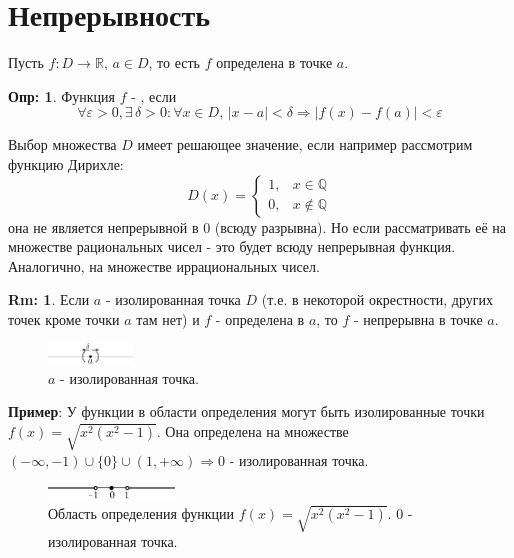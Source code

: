\documentclass[12pt]{article}
\theoremstyle{definition}
\newtheorem{defn}{Опр:}
\newtheorem{rem}{Rm:}
\begin{document}
\newpage 
\section*{Непрерывность}

Пусть $f \colon D \to \mathbb{R}, \, a \in D$, то есть $f$ определена в точке $a$.

\begin{defn}
	Функция $f$ - , если 
	$$\forall \varepsilon > 0, \exists \, \delta > 0 \colon \forall x \in D, \, |x-a| < \delta \Rightarrow |f(x) - f(a)| < \varepsilon$$
\end{defn}

Выбор множества $D$ имеет решающее значение, если например рассмотрим функцию Дирихле:
$$ 
	D(x) = 
	\begin{cases} 
		1, & x \in \mathbb{Q} \\
		0, & x \notin \mathbb{Q} 
	\end{cases}
$$
она не является непрерывной в $0$ (всюду разрывна). Но если рассматривать её на множестве рациональных чисел - это будет всюду непрерывная функция. Аналогично, на множестве иррациональных чисел.

\begin{rem}
	Если $a$ - изолированная точка $D$ (т.е. в некоторой окрестности, других точек кроме точки $a$ там нет) и $f$ - определена в $a$, то $f$ - непрерывна в точке $a$.  
\end{rem}

\begin{figure}[H]
	\centering
	\includegraphics[width=0.2\textwidth]{16_1.eps}
	\caption{$a$ - изолированная точка.}
	\label{16_1}
\end{figure}

\textbf{Пример}: У функции в области определения могут быть изолированные точки $f(x) = \sqrt{x^2(x^2 - 1)}$. Она определена на множестве $(-\infty, -1) \cup \{0\} \cup (1, +\infty) \Rightarrow 0$ - изолированная точка.

\begin{figure}[H]
	\centering
	\includegraphics[width=0.3\textwidth]{16_2.eps}
	\caption{Область определения функции $f(x) = \sqrt{x^2(x^2 - 1)}$. $0$ - изолированная точка.}
	\label{16_2}
\end{figure}
\end{document}

